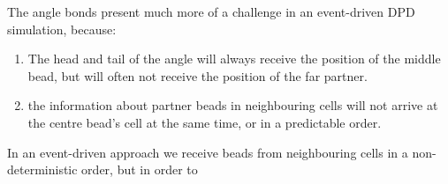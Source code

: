 \documentclass{article}
\begin{document}
The angle bonds present much more of a challenge in an event-driven
DPD simulation, because:
\begin{enumerate}
\item The head and tail of the angle will always receive the position of the middle
  bead, but will often not receive the position of the far partner.

\item the information about partner beads in neighbouring cells will not
  arrive at the centre bead's cell at the same time, or in a predictable order.
\end{enumerate}



In an event-driven approach we receive beads from neighbouring cells
in a non-deterministic order, but in order to 
\end{document}
